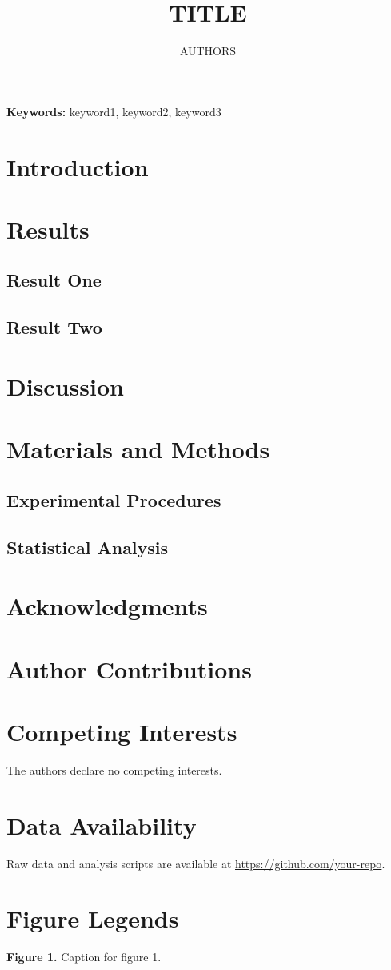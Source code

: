 \documentclass[10pt,letterpaper]{article}
\title{\Large\textbf{{{TITLE}}}}
\author[1,*]{{{AUTHORS}}}
\affil[1]{{{AFFILIATIONS}}}
\affil[*]{Correspondence: corresponding.author@institution.edu}
\date{}
\begin{document}
\maketitle
\thispagestyle{empty}
\begin{abstract}
\end{abstract}
\noindent\textbf{Keywords:} keyword1, keyword2, keyword3
\linenumbers
\newpage
\section*{Introduction}
\section*{Results}
\subsection*{Result One}
\subsection*{Result Two}
\section*{Discussion}
\section*{Materials and Methods}
\subsection*{Experimental Procedures}
\subsection*{Statistical Analysis}
\section*{Acknowledgments}
\section*{Author Contributions}
\section*{Competing Interests}
The authors declare no competing interests.
\section*{Data Availability}
Raw data and analysis scripts are available at \url{https://github.com/your-repo}.
\section*{Figure Legends}
\textbf{Figure 1. }Caption for figure 1.


\end{document}
